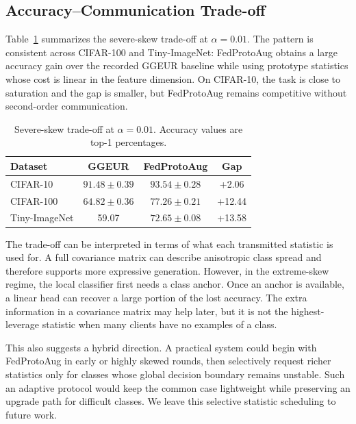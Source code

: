 ﻿\documentclass[runningheads]{llncs}
\newcommand{\method}{FedProtoAug}
\begin{document}
\subsection{Accuracy--Communication Trade-off}
Table~\ref{tab:tradeoff} summarizes the severe-skew trade-off at $\alpha=0.01$. The pattern is consistent across CIFAR-100 and Tiny-ImageNet: \method{} obtains a large accuracy gain over the recorded GGEUR baseline while using prototype statistics whose cost is linear in the feature dimension. On CIFAR-10, the task is close to saturation and the gap is smaller, but \method{} remains competitive without second-order communication.

\begin{table}[t]
\centering
\caption{Severe-skew trade-off at $\alpha=0.01$. Accuracy values are top-1 percentages.}
\label{tab:tradeoff}
\begin{tabular}{lccc}
\toprule
Dataset & GGEUR & \method{} & Gap \\
\midrule
CIFAR-10 & $91.48\pm0.39$ & $93.54\pm0.28$ & +2.06 \\
CIFAR-100 & $64.82\pm0.36$ & $77.26\pm0.21$ & +12.44 \\
Tiny-ImageNet & 59.07 & $72.65\pm0.08$ & +13.58 \\
\bottomrule
\end{tabular}
\end{table}

The trade-off can be interpreted in terms of what each transmitted statistic is used for. A full covariance matrix can describe anisotropic class spread and therefore supports more expressive generation. However, in the extreme-skew regime, the local classifier first needs a class anchor. Once an anchor is available, a linear head can recover a large portion of the lost accuracy. The extra information in a covariance matrix may help later, but it is not the highest-leverage statistic when many clients have no examples of a class.

This also suggests a hybrid direction. A practical system could begin with \method{} in early or highly skewed rounds, then selectively request richer statistics only for classes whose global decision boundary remains unstable. Such an adaptive protocol would keep the common case lightweight while preserving an upgrade path for difficult classes. We leave this selective statistic scheduling to future work.
\end{document}
